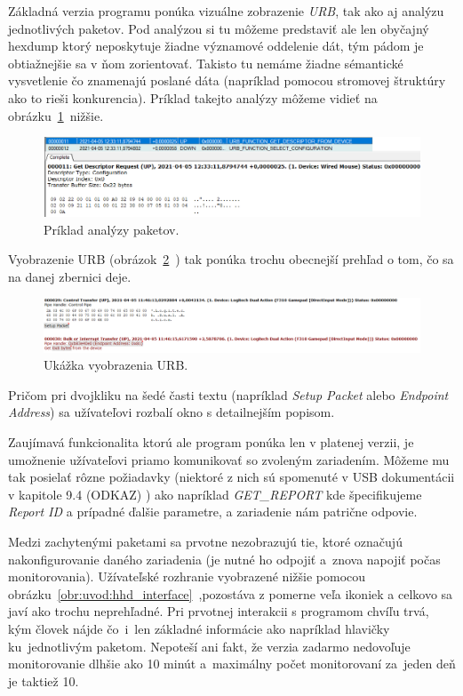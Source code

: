 \newpage

Základná verzia programu ponúka vizuálne zobrazenie \textit{URB}, tak ako aj analýzu jednotlivých paketov.
Pod analýzou si tu môžeme predstaviť ale len obyčajný hexdump ktorý neposkytuje žiadne významové oddelenie dát, tým pádom je obtiažnejšie sa v ňom zorientovať. Takisto tu nemáme žiadne sémantické vysvetlenie čo znamenajú poslané dáta (napríklad pomocou stromovej štruktúry ako to rieši konkurencia). Príklad takejto analýzy môžeme vidieť na obrázku~\ref{obr:uvod:hhd_analyza}~nižšie.

\begin{figure}[!htb]
	\centering
	\includegraphics[width=\textwidth]{img/uvod_hhd_analyza}
	\caption{Príklad analýzy paketov.}
	\label{obr:uvod:hhd_analyza}
\end{figure}

\newpage

Vyobrazenie URB (obrázok~\ref{obr:uvod:hhd_urb}~) tak ponúka trochu obecnejší prehľad o tom, čo sa na danej zbernici deje.

\begin{figure}[!htb]
	\centering
	\includegraphics[width=\textwidth]{img/uvod_hhd_urb}
	\caption{Ukážka vyobrazenia URB.}
	\label{obr:uvod:hhd_urb}
\end{figure}

Pričom pri dvojkliku na šedé časti textu (napríklad \textit{Setup Packet} alebo \textit{Endpoint Address}) sa užívateľovi rozbalí okno s detailnejším popisom.
 
Zaujímavá funkcionalita ktorú ale program ponúka len v platenej verzii, je umožnenie užívateľovi priamo komunikovať so zvoleným zariadením. Môžeme mu tak posielať rôzne požiadavky (niektoré z nich sú spomenuté v USB dokumentácii v kapitole 9.4 (ODKAZ) ) ako napríklad \textit{GET\_REPORT} kde špecifikujeme \textit{Report ID} a prípadné ďalšie parametre, a zariadenie nám patrične odpovie.

Medzi zachytenými paketami sa prvotne nezobrazujú tie, ktoré označujú nakonfigurovanie daného zariadenia (je nutné ho odpojiť a~znova napojiť počas monitorovania). Užívateľské rozhranie vyobrazené nižšie pomocou obrázku~\ref{obr:uvod:hhd_interface}~,pozostáva z pomerne veľa ikoniek a celkovo sa javí ako trochu neprehľadné. Pri prvotnej interakcii s programom chvíľu trvá, kým človek nájde čo~i~len základné informácie ako napríklad hlavičky ku~jednotlivým paketom. Nepoteší ani fakt, že verzia zadarmo nedovoľuje monitorovanie dlhšie ako 10 minút a~maximálny počet monitorovaní za~jeden deň je taktiež 10.

